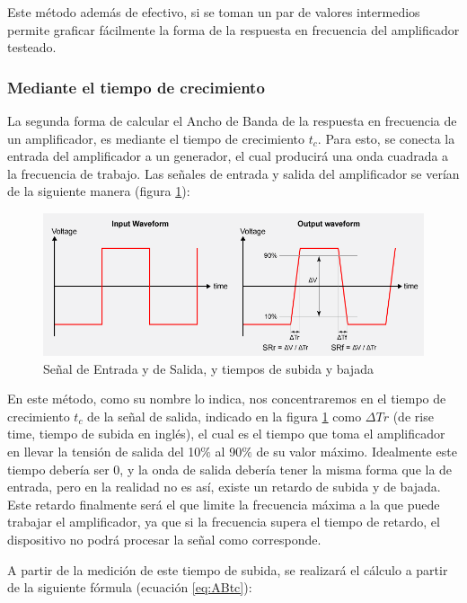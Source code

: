 Este método además de efectivo, si se toman un par de valores intermedios permite graficar fácilmente la forma de la respuesta en frecuencia del amplificador testeado.


\subsubsection{Mediante el tiempo de crecimiento}
\label{sec:AB_tc}

La segunda forma de calcular el Ancho de Banda de la respuesta en frecuencia de un amplificador, es mediante el tiempo de crecimiento $t_c$. Para esto, se conecta la entrada del amplificador a un generador, el cual producirá una onda cuadrada a la frecuencia de trabajo. Las señales de entrada y salida del amplificador se verían de la siguiente manera (figura \ref{fig:slewrate}):

\begin{figure}[H]
    \centering
    \includegraphics[width=\linewidth]{Imagenes/slewrate.png}
    \caption{Señal de Entrada y de Salida, y tiempos de subida y bajada}
    \label{fig:slewrate}
\end{figure}

En este método, como su nombre lo indica, nos concentraremos en el tiempo de crecimiento $t_c$ de la señal de salida, indicado en la figura \ref{fig:slewrate} como $\Delta Tr$ (de rise time, tiempo de subida en inglés), el cual es el tiempo que toma el amplificador en llevar la tensión de salida del 10$\%$ al 90$\%$ de su valor máximo. Idealmente este tiempo debería ser 0, y la onda de salida debería tener la misma forma que la de entrada, pero en la realidad no es así, existe un retardo de subida y de bajada. Este retardo finalmente será el que limite la frecuencia máxima a la que puede trabajar el amplificador, ya que si la frecuencia supera el tiempo de retardo, el dispositivo no podrá procesar la señal como corresponde.

A partir de la medición de este tiempo de subida, se realizará el cálculo a partir de la siguiente fórmula (ecuación \ref{eq:ABtc}):

